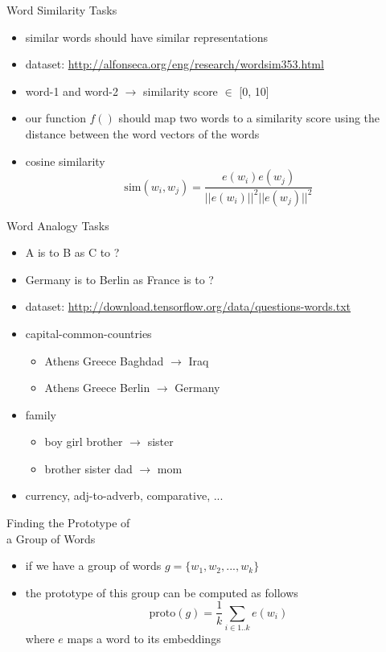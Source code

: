 \documentclass[12pt, handout]{beamer}
\begin{document}
\begin{frame}{Word Similarity Tasks}
	\begin{itemize}
		\item<1-> similar words should have similar representations
		\item<1-> dataset: \url{http://alfonseca.org/eng/research/wordsim353.html}
		\item<2->  word-1 and word-2 $\rightarrow$ similarity score $\in$ [0, 10]
		\item<3-> our function $f()$ should map two words to a similarity score using the distance between the word vectors of the words 
		\item<4-> cosine similarity
		\begin{equation*}
		\text{sim}(w_i,w_j) = \frac{e(w_i) e(w_j)}{||e(w_i)||^2 ||e(w_j)||^2}
		\end{equation*} 
	\end{itemize}
\end{frame}
\begin{frame}{Word Analogy Tasks}
	\begin{itemize}
		\item<1-> A is to B as C to ?
		\item<2-> Germany is to Berlin as France is to ?
		\item<2-> dataset:
		\url{http://download.tensorflow.org/data/questions-words.txt}
		\item<3-> capital-common-countries
		\begin{itemize}
			\item<3-> Athens Greece Baghdad  $\rightarrow$ Iraq
			\item<3-> Athens Greece Berlin  $\rightarrow$ Germany
		\end{itemize}
		\item<4-> family
		\begin{itemize}
			\item<4-> boy girl brother $\rightarrow$ sister
			\item<4-> brother sister dad $\rightarrow$ mom
		\end{itemize}
		\item<5-> currency, adj-to-adverb, comparative, ...
	\end{itemize}
\end{frame}
\begin{frame}{Finding the Prototype of  \\ a Group of Words}
	\begin{itemize}
		\item<1-> if we have a group of words $g = \{ w_1, w_2, ..., w_k \}$
		\item<2-> the prototype of this group can be computed as follows
		\begin{equation*}
		\text{proto}(g) = \frac{1}{k} \sum_{i \in 1..k} e(w_i)
		\end{equation*}
		where $e$ maps a word to its  embeddings
	\end{itemize}
\end{frame}
\end{document}
